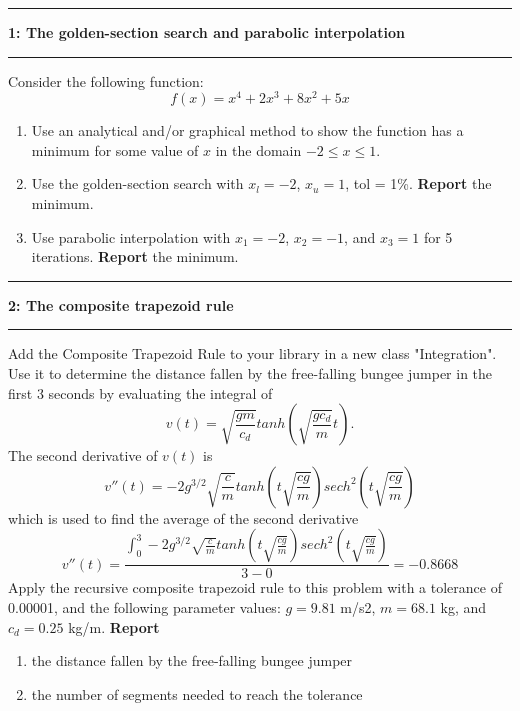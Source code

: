 \documentclass[11pt]{article}
\newcommand\question[2]{\vspace{.25in}\hrule\textbf{#1: #2}\vspace{.5em}\hrule\vspace{.10in}}
\begin{document}
\raggedright
\newcommand\Page{\page  / \lastPage}
\newcommand\page{1}
\newcommand\qN[2]{\Large {#1} \small{#2} \normalsize}

\newcommand\dueDate{\today}
\newcommand\hwnum{5}
\newcommand\ExNum{}

\newcommand\lastPage{3}

\lhead{\large Homework \hwnum }
\rhead{\rightHead}
\newcommand\rightHead{\large Due Nov 27, 2021}

\question{1}{The golden-section search and parabolic interpolation }
Consider the following function:
$$f(x) = x^4 + 2x^3 +8x^2+5x $$
\begin{enumerate}[label = (\alph*)]
	\item Use an analytical and/or graphical method to show the function has a minimum for some value of $x$ in the domain $-2\leq x\leq1$.
	\item Use the golden-section search with $x_l = -2$, $x_u = 1$, tol = 1\%. \textbf{Report} the minimum.
	\item Use parabolic interpolation with $x_1 = -2$, $x_2 = -1$, and $x_3 = 1$ for 5 iterations. \textbf{Report} the minimum.
\end{enumerate}
\vspace{4.5cm}
\question{2}{The composite trapezoid rule}
Add the Composite Trapezoid Rule to your library in a new class "Integration". Use it to determine the distance fallen by the free-falling bungee jumper in the first 3 seconds by evaluating the integral of
	$$v(t) = \sqrt{\frac{gm}{c_d}}tanh\left(\sqrt{\frac{gc_d}{m}}t\right). $$
The second derivative of $v(t)$ is 
	$$v''(t) = -2g^{3/2}\sqrt{\frac{c}{m}}tanh\left(t\sqrt{\frac{cg}{m}}\right)sech^2\left(t\sqrt{\frac{cg}{m}}\right)$$ 
	which is used to find the average of the second derivative
	$$v''(t) = \frac{\int_{0}^{3}-2g^{3/2}\sqrt{\frac{c}{m}}tanh\left(t\sqrt{\frac{cg}{m}}\right)sech^2\left(t\sqrt{\frac{cg}{m}}\right)}{3-0} = -0.8668$$ 
	Apply the recursive composite trapezoid rule to this problem with a tolerance of 0.00001, and the following parameter values: $g = 9.81$ m/s2, $m = 68.1$ kg, and
	$c_d = 0.25$ kg/m. \textbf{Report} 
	\begin{enumerate}
		\item the distance fallen by the free-falling bungee jumper
		\item the number of segments needed to reach the tolerance
	\end{enumerate}  
\end{document}
